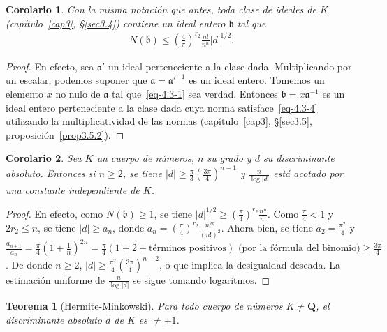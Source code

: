 \documentclass[10pt,oneside,bibtotoc,smallheadings,leqno,a5paper,DIV=12]{scrbook}
\newcommand{\QQ}{\mathbf{Q}}
\newcommand{\idl}[1]{\mathfrak{#1}}
\newcommand{\abs}[1]{\left\lvert#1\right\rvert}
\numberwithin{equation}{section}
\theoremstyle{defi}
\theoremstyle{enonce}
\newtheorem{theorem}{Teorema}
\newtheorem{corollary}{Corolario}
\theoremstyle{rem}
\numberwithin{theorem}{section}
\numberwithin{proposition}{section}
\numberwithin{definition}{section}
\numberwithin{lemma}{section}
\numberwithin{corollary}{section}
\numberwithin{example}{section}
\numberwithin{footnote}{section}%
\begin{document}
\begin{corollary}\label{cor4.3.1}
Con la misma notaci\'on que antes, toda clase de ideales de $K$ (cap\'itulo~\ref{cap3}, \S\ref{sec3.4})
contiene un ideal entero $\idl{b}$ tal que
\begin{gather}\label{eq-4.3-4}
N(\idl{b})\leq\left(\frac{4}{\pi}\right)^{r_{2}}\frac{n!}{n^{n}}\abs{d}^{1/2}.
\end{gather}
\end{corollary}

\begin{proof}
En efecto, sea $\idl{a}'$ un ideal perteneciente a la clase dada. Multiplicando por un escalar, podemos suponer
que $\idl{a} = \idl{a}'^{-1}$ es un ideal entero. Tomemos un elemento $x$ no nulo de $\idl{a}$ tal que~\eqref{eq-4.3-1}
sea verdad. Entonces $\idl{b} = x\idl{a}^{-1}$ es un ideal entero perteneciente a la clase dada cuya norma
satisface~\eqref{eq-4.3-4} utilizando la multiplicatividad de las normas (cap\'itulo~\ref{cap3}, \S\ref{sec3.5},
proposici\'on~\ref{prop3.5.2}).
\end{proof}

\begin{corollary}\label{cor4.3.2}
Sea $K$ un cuerpo de n\'umeros, $n$ su grado y $d$ su discriminante absoluto. Entonces si $n\geq 2$, se tiene
$\abs{d}\geq\frac{\pi}{3}\left(\frac{3\pi}{4}\right)^{n-1}$ y $\frac{n}{\log\abs{d}}$ est\'a acotado por una
constante independiente de $K$.
\end{corollary}

\begin{proof}
En efecto, como $N(\idl{b})\geq 1$, se tiene $\abs{d}^{1/2}\geq\left(\frac{\pi}{4}\right)^{r_{2}}\frac{n^{n}}{n!}$.
Como $\frac{\pi}{4} < 1$ y $2r_{2}\leq n$, se tiene $\abs{d}\geq a_{n}$, donde
$a_{n} = \left(\frac{\pi}{4}\right)^{r_{2}}\frac{n^{2n}}{(n!)^{2}}$. Ahora bien, se tiene $a_{2} = \frac{\pi^{2}}{4}$
y $\frac{a_{n+1}}{a_{n}} = \frac{\pi}{4}\left(1+\frac{1}{n}\right)^{2n} = \frac{\pi}{4}(1+2+\text{t\'erminos positivos})
\text{ (por la f\'ormula del binomio)} \geq \frac{3\pi}{4}$. De donde $n\geq 2$,
$\abs{d}\geq\frac{\pi^{2}}{4}\left(\frac{3\pi}{4}\right)^{n-2}$,
o que implica la desigualdad deseada. La estimaci\'on uniforme de $\frac{n}{\log\abs{d}}$ se sigue tomando logaritmos.
\end{proof}

\begin{theorem}[Hermite-Minkowski]
Para todo cuerpo de n\'umeros $K\neq\QQ$, el discriminante absoluto $d$ de $K$ es $\neq\pm 1$.
\end{theorem}
\end{document}
